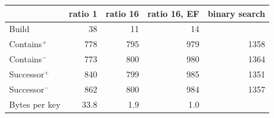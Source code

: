\begin{tabular}{lrrrr}
&\multicolumn{1}{c}{ratio 1}&\multicolumn{1}{c}{ratio 16}&\multicolumn{1}{c}{ratio 16, EF}&\multicolumn{1}{c}{binary search}\\
\hline
Build & 38 & 11 & 14 & \\
Contains$^+$ & 778 & 795 & 979 & 1358\\
Contains$^-$ & 773 & 800 & 980 & 1364\\
Successor$^+$ & 840 & 799 & 985 & 1351\\
Successor$^-$ & 862 & 800 & 984 & 1357\\
\hline
Bytes per key & 33.8 & 1.9 & 1.0 & \\
\end{tabular}
